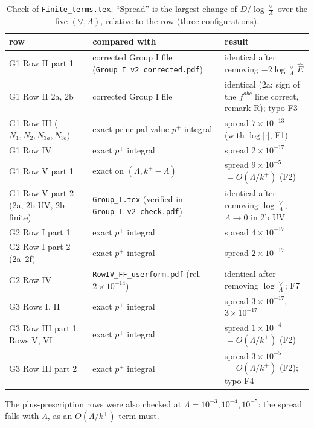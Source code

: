 \documentclass[10pt]{article}
\numberwithin{equation}{section}
\newcommand{\Eh}{\hat E}
\begin{document}
\begin{table}[H]\centering\small
\caption{Check of \texttt{Finite\_terms.tex}. ``Spread'' is the largest change of $D/\log\frac{\vee}{\Lambda}$ over the five $(\vee,\Lambda)$, relative to the row (three configurations).}\label{tab:check}
\begin{tabular}{@{}>{\raggedright\arraybackslash}p{}>{\raggedright\arraybackslash}p{}>{\raggedright\arraybackslash}p{}@{}}\toprule
row & compared with & result\\\midrule
G1 Row II part 1 & corrected Group I file (\texttt{Group\_I\_v2\_corrected.pdf}) & identical after removing $-2\log\frac{\vee}{\Lambda}\,\Eh$\\
G1 Row II 2a, 2b & corrected Group I file & identical (2a: sign of the $f^{abc}$ line correct, remark R); typo F3\\
G1 Row III ($N_1,N_2,N_{3a},N_{3b}$) & exact principal-value $p^+$ integral & spread $7\times10^{-13}$ (with $\log|\cdot|$, F1)\\
G1 Row IV & exact $p^+$ integral & spread $2\times10^{-17}$\\
G1 Row V part 1 & exact on $(\Lambda,k^+-\Lambda)$ & spread $9\times10^{-5}$ $=O(\Lambda/k^+)$ (F2)\\
G1 Row V part 2 (2a, 2b UV, 2b finite) & \texttt{Group\_I.tex} (verified in \texttt{Group\_I\_v2\_check.pdf}) & identical after removing $\log\frac{\vee}{\Lambda}$; $\Lambda\to0$ in 2b UV\\
G2 Row I part 1 & exact $p^+$ integral & spread $4\times10^{-17}$\\
G2 Row I part 2 (2a--2f) & exact $p^+$ integral & spread $2\times10^{-17}$\\
G2 Row IV & \texttt{RowIV\_FF\_userform.pdf} (rel.\ $2\times10^{-14}$) & identical after removing $\log\frac{\vee}{\Lambda}$; F7\\
G3 Rows I, II & exact $p^+$ integral & spread $3\times10^{-17}$, $3\times10^{-17}$\\
G3 Row III part 1, Rows V, VI & exact $p^+$ integral & spread $1\times10^{-4}$ $=O(\Lambda/k^+)$ (F2)\\
G3 Row III part 2 & exact $p^+$ integral & spread $3\times10^{-5}$ $=O(\Lambda/k^+)$ (F2); typo F4\\\bottomrule
\end{tabular}
\end{table}
The plus-prescription rows were also checked at $\Lambda=10^{-3},10^{-4},10^{-5}$: the spread falls with $\Lambda$, as an $O(\Lambda/k^+)$ term must.
\end{document}

